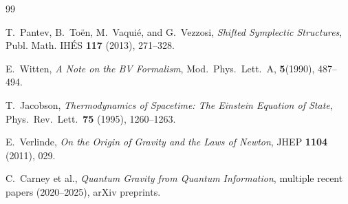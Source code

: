 \documentclass[12pt]{article}
\theoremstyle{plain}
\theoremstyle{definition}
\theoremstyle{remark}
\begin{document}
\newpage



\begin{thebibliography}{99}

T.~Pantev, B.~To\"en, M.~Vaquié, and G.~Vezzosi,
\emph{Shifted Symplectic Structures},
Publ. Math. IHÉS \textbf{117} (2013), 271–328.

E.~Witten,
\emph{A Note on the BV Formalism},
Mod.\ Phys.\ Lett.\ A, \textbf{5}(1990), 487--494.

T.~Jacobson,
\emph{Thermodynamics of Spacetime: The Einstein Equation of State},
Phys.\ Rev.\ Lett.\ \textbf{75} (1995), 1260--1263.

E.~Verlinde,
\emph{On the Origin of Gravity and the Laws of Newton},
JHEP \textbf{1104} (2011), 029.

C.~Carney et al.,
\emph{Quantum Gravity from Quantum Information},
multiple recent papers (2020--2025), arXiv preprints.

\end{thebibliography}
\end{document}
